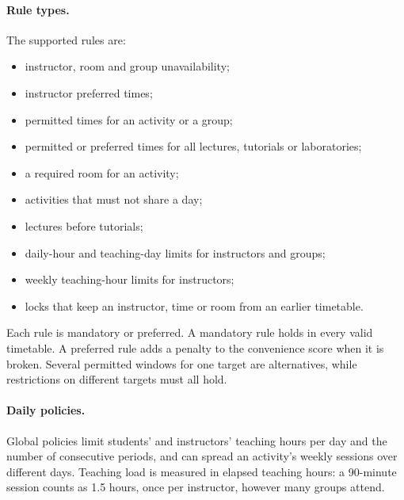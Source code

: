 \paragraph{Rule types.} The supported rules are:
\begin{itemize}
\item instructor, room and group unavailability;
\item instructor preferred times;
\item permitted times for an activity or a group;
\item permitted or preferred times for all lectures, tutorials or laboratories;
\item a required room for an activity;
\item activities that must not share a day;
\item lectures before tutorials;
\item daily-hour and teaching-day limits for instructors and groups;
\item weekly teaching-hour limits for instructors;
\item locks that keep an instructor, time or room from an earlier timetable.
\end{itemize}
Each rule is mandatory or preferred. A mandatory rule holds in every valid timetable. A preferred rule adds a penalty to the convenience score when it is broken. Several permitted windows for one target are alternatives, while restrictions on different targets must all hold.

\paragraph{Daily policies.} Global policies limit students' and instructors' teaching hours per day and the number of consecutive periods, and can spread an activity's weekly sessions over different days. Teaching load is measured in elapsed teaching hours: a 90-minute session counts as 1.5 hours, once per instructor, however many groups attend.

